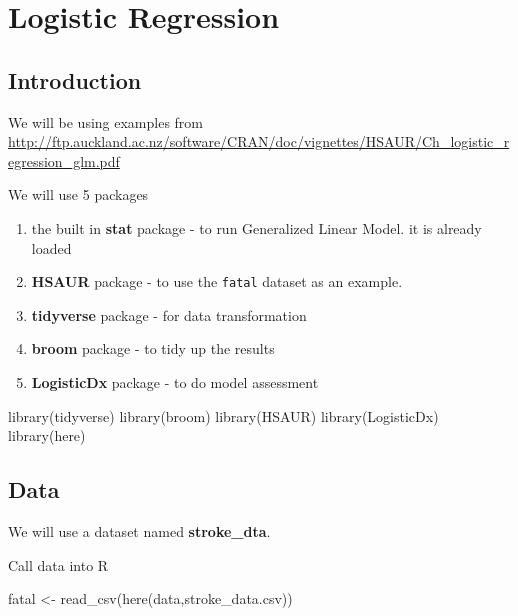 \documentclass[
]{book}
\makeatletter
\newenvironment{Shaded}{\begin{snugshade}}{\end{snugshade}}
\newcommand{\FunctionTok}[1]{\textcolor[rgb]{0,0,0}{#1}}
\newcommand{\NormalTok}[1]{#1}
\newcommand{\OtherTok}[1]{\textcolor[rgb]{0.37,0.37,0.37}{#1}}
\newcommand{\StringTok}[1]{\textcolor[rgb]{0.5,0.5,0.5}{#1}}
\providecommand{\tightlist}{%
  \setlength{\itemsep}{0pt}\setlength{\parskip}{0pt}}
\newenvironment{kframe}{%
\medskip{}
\setlength{\fboxsep}{.8em}
 \def\at@end@of@kframe{}%
 \ifinner\ifhmode%
  \def\at@end@of@kframe{\end{minipage}}%
  \begin{minipage}{\columnwidth}%
 \fi\fi%
 \def\FrameCommand##1{\hskip\@totalleftmargin \hskip-\fboxsep
 \colorbox{shadecolor}{##1}\hskip-\fboxsep
     \hskip-\linewidth \hskip-\@totalleftmargin \hskip\columnwidth}%
 \MakeFramed {\advance\hsize-\width
   \@totalleftmargin\z@ \linewidth\hsize
   \@setminipage}}%
 {\par\unskip\endMakeFramed%
 \at@end@of@kframe}
\renewenvironment{Shaded}{\begin{kframe}}{\end{kframe}}
\makeatother
\begin{document}
\hypertarget{logistic-regression}{%
\chapter{Logistic Regression}\label{logistic-regression}}

\hypertarget{introduction}{%
\section{Introduction}\label{introduction}}

We will be using examples from \url{http://ftp.auckland.ac.nz/software/CRAN/doc/vignettes/HSAUR/Ch_logistic_regression_glm.pdf}

We will use 5 packages

\begin{enumerate}
\def\labelenumi{\arabic{enumi}.}
\tightlist
\item
  the built in \textbf{stat} package - to run Generalized Linear Model. it is already loaded
\item
  \textbf{HSAUR} package - to use the \texttt{fatal} dataset as an example.
\item
  \textbf{tidyverse} package - for data transformation
\item
  \textbf{broom} package - to tidy up the results
\item
  \textbf{LogisticDx} package - to do model assessment
\end{enumerate}

\begin{Shaded}
\begin{Highlighting}[]
\FunctionTok{library}\NormalTok{(tidyverse)}
\FunctionTok{library}\NormalTok{(broom)}
\FunctionTok{library}\NormalTok{(HSAUR)}
\FunctionTok{library}\NormalTok{(LogisticDx)}
\FunctionTok{library}\NormalTok{(here)}
\end{Highlighting}
\end{Shaded}

\hypertarget{data}{%
\section{Data}\label{data}}

We will use a dataset named \textbf{stroke\_dta}.

Call data into R

\begin{Shaded}
\begin{Highlighting}[]
\NormalTok{fatal }\OtherTok{\textless{}{-}} \FunctionTok{read\_csv}\NormalTok{(}\FunctionTok{here}\NormalTok{(}\StringTok{\textquotesingle{}data\textquotesingle{}}\NormalTok{,}\StringTok{\textquotesingle{}stroke\_data.csv\textquotesingle{}}\NormalTok{))}
\end{Highlighting}
\end{Shaded}
\end{document}
